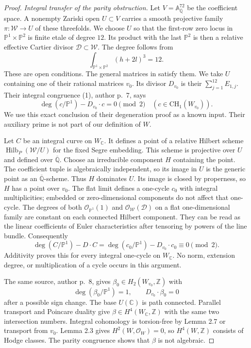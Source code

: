 \begin{proof}
\emph{Integral transfer of the parity obstruction.}
Let $V=\mathbb A^{72}_{\overline{\mathbb Q}}$ be the coefficient
space. A nonempty Zariski open $U\subset V$ carries a smooth
projective family $\pi:\mathcal W\to U$ of these threefolds.
We choose $U$ so that the first-row zero locus in
$\mathbb P^1\times\mathbb P^2$ is finite etale of degree $12$.
Its product with the last $\mathbb P^2$ is then a relative
effective Cartier divisor $\mathcal D\subset\mathcal W$.
The degree follows from
\[
          \int_{\mathbb P^1\times\mathbb P^2}(h+2l)^3=12.
\]
These are open conditions. The general matrices in
\citet[Lemmas 2.3--2.7 and Theorem 3.1, author pp.~4--8]
{cyOttemSuzuki2020} satisfy them. We take $U$ containing one
of their rational matrices $v_0$. Its divisor $D_{v_0}$ is
their $\sum_{j=1}^{12}E_{1,j}$. Their integral congruence (1),
author p.~7, says
\begin{equation}\label{eq:os-parity-all-curves}
 \deg(c/\mathbb P^1)-D_{v_0}\cdot c=0\pmod2
               \quad(c\in\mathrm{CH}_1(W_{v_0})).
\end{equation}
We use this exact conclusion of their degeneration proof as a
known input. Their auxiliary prime is not part of our
definition of $W$.

Let $C$ be an integral curve on $W_{\mathbb C}$. It defines a
point of a relative Hilbert scheme
$\operatorname{Hilb}_P(\mathcal W/U)$ for the fixed Segre
embedding. This scheme is projective over $U$ and defined over
$\overline{\mathbb Q}$. Choose an irreducible component $H$
containing the point. The coefficient tuple is algebraically
independent, so its image in $U$ is the generic point as an
$\overline{\mathbb Q}$-scheme. Thus $H$ dominates $U$.
Its image is closed by properness, so $H$ has a point over $v_0$.
The flat limit defines a one-cycle $c_0$ with integral multiplicities; embedded or
zero-dimensional components do not affect that one-cycle.
The degrees of both
$\mathcal O_{\mathbb P^1}(1)$ and
$\mathcal O_{\mathcal W}(\mathcal D)$ on a flat
one-dimensional family are constant on each connected Hilbert
component. They can be read as the linear coefficients of
Euler characteristics after tensoring by powers of the line bundle.
Consequently
\[
 \deg(C/\mathbb P^1)-D\cdot C
   =\deg(c_0/\mathbb P^1)-D_{v_0}\cdot c_0\equiv0\pmod2.
\]
Additivity proves this for every integral one-cycle on
$W_{\mathbb C}$. No norm, extension degree, or multiplication
of a cycle occurs in this argument.

The same source, author p.~8, gives
$\beta_0\in H_2(W_{v_0},\mathbb Z)$ with
\[
        \deg(\beta_0/\mathbb P^1)=1,\qquad D_{v_0}\cdot\beta_0=0
\]
after a possible sign change. The base $U(\mathbb C)$ is path
connected. Parallel transport and Poincare duality give
$\beta\in H^4(W_{\mathbb C},\mathbb Z)$ with the same two
intersection numbers. Integral cohomology is torsion-free by
Lemma 2.7 or transport from $v_0$. Lemma 2.3 gives
$H^2(W,\mathcal O_W)=0$, so $H^4(W,\mathbb Z)$ consists of
Hodge classes. The parity congruence shows that $\beta$ is
not algebraic.


\end{proof}

